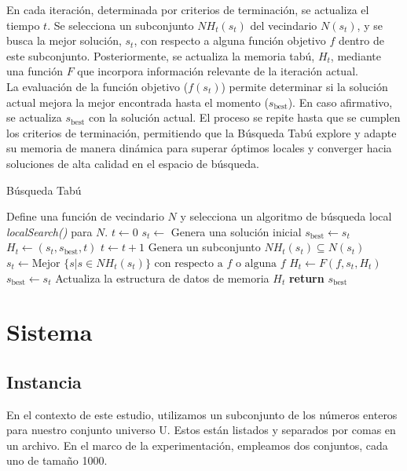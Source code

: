 \documentclass[spanish,12pt,letterpaper]{article}
\begin{document}
	En cada iteración, determinada por criterios de terminación, se actualiza el tiempo \(t\). Se selecciona un subconjunto \(NH_t(s_t)\) del vecindario \(N(s_t)\), y se busca la mejor solución, \(s_t\), con respecto a alguna función objetivo \(f\) dentro de este subconjunto. Posteriormente, se actualiza la memoria tabú, \(H_t\), mediante una función \(F\) que incorpora información relevante de la iteración actual.\\
	
	La evaluación de la función objetivo (\(f(s_t)\)) permite determinar si la solución actual mejora la mejor encontrada hasta el momento (\(s_{\text{best}}\)). En caso afirmativo, se actualiza \(s_{\text{best}}\) con la solución actual. El proceso se repite hasta que se cumplen los criterios de terminación, permitiendo que la Búsqueda Tabú explore y adapte su memoria de manera dinámica para superar óptimos locales y converger hacia soluciones de alta calidad en el espacio de búsqueda.\\
	
	
	\begin{algorithm}
		\caption{Búsqueda Tabú}
		\begin{algorithmic}[1]
			\State Define una función de vecindario $N$ y selecciona un algoritmo de búsqueda local \textit{localSearch()} para $N$.
			\State $t \gets 0$
			\State $s_t \gets$ Genera una solución inicial
			\State $s_{\text{best}} \gets s_t$
			\State $H_t \gets (s_t, s_{\text{best}}, t)$ 
			\State $t \gets t + 1$
			\State Genera un subconjunto $NH_t(s_t) \subseteq N(s_t)$
			\State $s_t \gets \text{Mejor } \{s | s \in NH_t(s_t)\} \text{ con respecto a } f \text{ o alguna } f$
			\State $H_t \gets F(f, s_t, H_t)$
			\State $s_{\text{best}} \gets s_t$
			\EndIf
			\State Actualiza la estructura de datos de memoria $H_t$
			\EndWhile
			\State \textbf{return} $s_{\text{best}}$
			\EndProcedure
		\end{algorithmic}
	\end{algorithm}
	
	\section{Sistema}
	\subsection{Instancia}
	En el contexto de este estudio, utilizamos un subconjunto de los números enteros para nuestro conjunto universo U. Estos están listados y separados por comas en un archivo. En el marco de la experimentación, empleamos dos conjuntos, cada uno de tamaño 1000.
\end{document}
